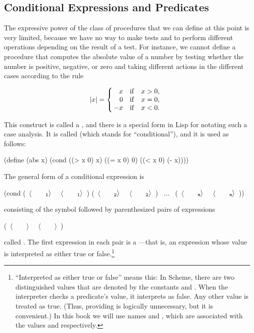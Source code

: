 \subsection{Conditional Expressions and Predicates}
\label{Section 1.1.6}

The expressive power of the class of procedures that we can define at this
point is very limited, because we have no way to make tests and to perform
different operations depending on the result of a test. For instance, we
cannot define a procedure that computes the absolute value of a number by
testing whether the number is positive, negative, or zero and taking different
actions in the different cases according to the rule

$$
 |x| = \left\{ \begin{array}{r@{\quad \mathrm{if} \quad}l}
        x  &  x > 0, \\
	0  &  x = 0, \\
  \!\! -x  &  x < 0. \end{array} \right.
$$

This construct is called a , and there is a special form
in Lisp for notating such a case analysis.  It is called  (which
stands for ``conditional''), and it is used as follows:

\begin{codeBlock}
(define (abs x)
  (cond ((> x 0) x)
        ((= x 0) 0)
        ((< x 0) (- x))))
\end{codeBlock}

\noindent
The general form of a conditional expression is

\begin{codeBlock}
(cond (~\(\langle \)~~~~\(_{\mono{1}}\rangle \)~ ~\(\langle \)~~~~\(_{\mono{1}}\rangle \)~)
      (~\(\langle \)~~~~\(_{\mono{2}}\rangle \)~ ~\(\langle \)~~~~\(_{\mono{2}}\rangle \)~)
      ~\( \dots \)~
      (~\(\langle \)~~~~\(_{\monoItalic{n}}\rangle \)~ ~\(\langle \)~~~~\(_{\monoItalic{n}}\rangle \)~))
\end{codeBlock}

\noindent
consisting of the symbol  followed by parenthesized pairs of
expressions

\begin{codeBlock}
(~\(\langle \)~~~~\(\rangle \)~ ~\(\langle \)~~~~\(\rangle \)~)
\end{codeBlock}

\noindent
called . The first expression in each pair is a
---that is, an expression whose value is interpreted as
either true or false.\footnote{``Interpreted as either true or false'' means
this: In Scheme, there are two distinguished values that are denoted by the
constants  and .  When the interpreter checks a predicate's
value, it interprets  as false.  Any other value is treated as true.
(Thus, providing  is logically unnecessary, but it is convenient.)  In
this book we will use names  and , which are associated
with the values  and  respectively.}

